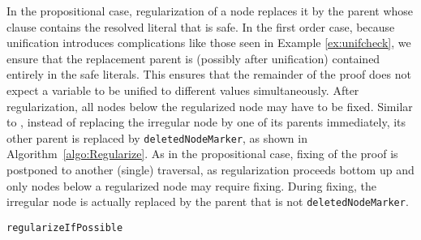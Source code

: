 In the propositional case, regularization of a node replaces it by the parent whose clause contains the resolved literal that is safe. In the first order case, because unification introduces complications like those seen in Example \ref{ex:unifcheck}, we ensure that the replacement parent is (possibly after unification) contained entirely in the safe literals. This ensures that the remainder of the proof does not expect a variable to be unified to different values simultaneously. After regularization, all nodes below the regularized node may have to be fixed. 
Similar to \RecyclePivotsIntersection, instead of replacing the irregular node by one of its parents immediately, 
its other parent is replaced by \texttt{deletedNodeMarker}, as shown in Algorithm~\ref{algo:Regularize}.
As in the propositional case, fixing of the proof is postponed to another (single) traversal, as regularization proceeds bottom up and only nodes below a regularized node may require fixing.
During fixing, the irregular node is actually replaced by the parent that is not \texttt{deletedNodeMarker}.


\begin{algorithm}[t]
\begin{footnotesize}



\BlankLine
\caption{\label{algo:Regularize} \texttt{regularizeIfPossible}}
\end{footnotesize}
\end{algorithm}


